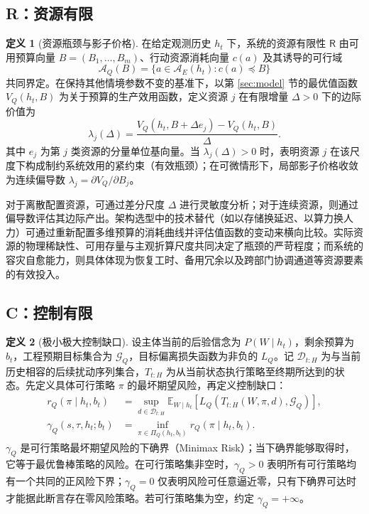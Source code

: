 \documentclass[11pt,a4paper]{ctexart}
\numberwithin{equation}{section}
\theoremstyle{definition}
\newtheorem{definition}{定义}[section]
\theoremstyle{plain}
\newcommand{\Res}{\mathsf{R}}
\begin{document}
\subsection{R：资源有限}

\begin{definition}[资源瓶颈与影子价格]
在给定观测历史 $h_t$ 下，系统的资源有限性 $\Res$ 由可用预算向量 $B=(B_1,\ldots,B_m)$、行动资源消耗向量 $c(a)$ 及其诱导的可行域
\[
\mathcal A_Q(B)=\{a\in\mathcal A_E(h_t):c(a)\preceq B\}
\]
共同界定。在保持其他情境参数不变的基准下，以第 \ref{sec:model} 节的最优值函数 $V_Q(h_t,B)$ 为关于预算的生产效用函数，定义资源 $j$ 在有限增量 $\Delta>0$ 下的边际价值为
\begin{equation}
\lambda_j(\Delta)=
\frac{V_Q(h_t,B+\Delta e_j)-V_Q(h_t,B)}{\Delta}.
\label{eq:shadow-price}
\end{equation}
其中 $e_j$ 为第 $j$ 类资源的分量单位基向量。当 $\lambda_j(\Delta)>0$ 时，表明资源 $j$ 在该尺度下构成制约系统效用的紧约束（有效瓶颈）；在可微情形下，局部影子价格收敛为连续偏导数 $\lambda_j=\partial V_Q/\partial B_j$。
\end{definition}

对于离散配置资源，可通过差分尺度 $\Delta$ 进行灵敏度分析；对于连续资源，则通过偏导数评估其边际产出。架构选型中的技术替代（如以存储换延迟、以算力换人力）可通过重新配置多维预算的消耗曲线并评估值函数的变动来横向比较。实际资源的物理稀缺性、可用存量与主观折算尺度共同决定了瓶颈的严苛程度；而系统的容灾自愈能力，则具体体现为恢复工时、备用冗余以及跨部门协调通道等资源要素的有效投入。

\subsection{C：控制有限}
\label{sec:control-bounds}

\begin{definition}[极小极大控制缺口]
设主体当前的后验信念为 $P(W\mid h_t)$，剩余预算为 $b_t$，工程预期目标集合为 $\mathcal G_Q$，目标偏离损失函数为非负的 $L_Q$。记 $\mathcal D_{t:H}$ 为与当前历史相容的后续扰动序列集合，$T_{t:H}$ 为从当前状态执行策略至终期所达到的状态。先定义具体可行策略 $\pi$ 的最坏期望风险，再定义控制缺口：
\begin{align}
r_Q(\pi\mid h_t,b_t)
&=\sup_{d\in\mathcal D_{t:H}}
\mathbb E_{W\mid h_t}
\left[L_Q(T_{t:H}(W,\pi,d),\mathcal G_Q)\right],
\label{eq:policy-risk}\\
\gamma_Q(s,\tau,h_t;b_t)
&=\inf_{\pi\in\Pi_Q(h_t,b_t)}r_Q(\pi\mid h_t,b_t).
\label{eq:control-gap}
\end{align}
$\gamma_Q$ 是可行策略最坏期望风险的下确界（Minimax Risk）；当下确界能够取得时，它等于最优鲁棒策略的风险。在可行策略集非空时，$\gamma_Q>0$ 表明所有可行策略均有一个共同的正风险下界；$\gamma_Q=0$ 仅表明风险可任意逼近零，只有下确界可达时才能据此断言存在零风险策略。若可行策略集为空，约定 $\gamma_Q=+\infty$。
\end{definition}
\end{document}
